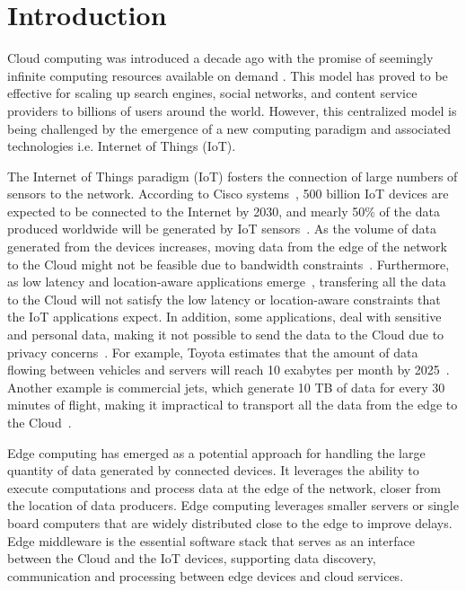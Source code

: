\section{Introduction}
Cloud computing was introduced a decade ago with the promise of seemingly infinite computing resources available on demand \cite{Armbrust09abovethe}. This model has proved to be effective for scaling up search engines\cite{7073834}, social networks\cite{6596496}, and content service providers\cite{6915771} to billions of users around the world. However, this centralized model is being challenged by the emergence of a new computing paradigm and associated technologies i.e. Internet of Things (IoT).

The Internet of Things paradigm (IoT) fosters the connection of large numbers of sensors to the network. According to Cisco systems~\cite{ciscoGlance}, 500 billion IoT devices are expected to be connected to the Internet by 2030, and mearly 50\% of the data produced worldwide will be generated by IoT sensors~\cite{McAuley}. As the volume of data generated from the devices increases, moving data from the edge of the network to the Cloud might not be feasible due to bandwidth constraints~\cite{8289317}. Furthermore, as low latency and location-aware applications emerge~\cite{7389122}, transfering all the data to the Cloud will not satisfy the low latency or location-aware constraints that the IoT applications expect. In addition, some applications, deal with sensitive and personal data, making it not possible to send the data to the Cloud due to privacy concerns~\cite{7849185}. For example, Toyota estimates that the amount of data flowing between vehicles and servers will reach 10 exabytes per month by 2025~\cite{Toyota}. Another example is commercial jets, which generate 10 TB of data for every 30 minutes of flight, making it impractical to transport all the data from the edge to the Cloud~\cite{ciscoJet}. 

Edge computing has emerged as a potential approach for handling the large quantity of data generated by connected devices. It leverages the ability to execute computations and process data at the edge of the network, closer from the location of data producers. Edge computing leverages smaller servers or single board computers that are widely distributed close to the edge to improve delays. Edge middleware is the essential software stack that serves as an interface between the Cloud and the IoT devices, supporting data discovery, communication and processing between edge devices and cloud services. %

